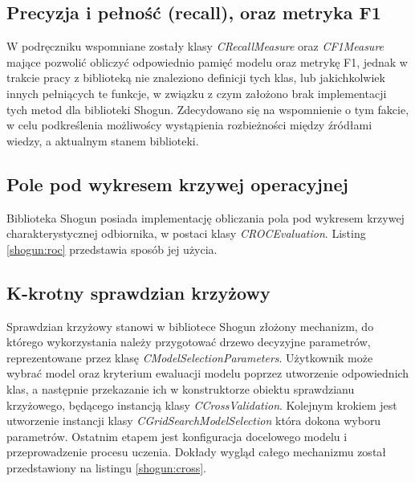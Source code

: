 
\subsection{Precyzja i pełność (recall), oraz metryka F1}

W podręczniku \cite{handsOnMachineLearning} wspomniane zostały klasy \textit{CRecallMeasure} oraz \textit{CF1Measure} mające pozwolić obliczyć odpowiednio pamięć modelu oraz metrykę F1, jednak w trakcie pracy z biblioteką nie znaleziono definicji tych klas, lub jakichkolwiek innych pełniących te funkcje, w związku z czym założono brak implementacji tych metod dla biblioteki Shogun. Zdecydowano się na wspomnienie o tym fakcie, w celu podkreślenia możliwoścy wystąpienia rozbieżności między źródłami wiedzy, a aktualnym stanem biblioteki.

\subsection{Pole pod wykresem krzywej operacyjnej}

Biblioteka Shogun posiada implementację obliczania pola pod wykresem krzywej charakterystycznej odbiornika, w postaci klasy \textit{CROCEvaluation}. Listing \ref{shogun:roc} przedstawia sposób jej użycia.


\subsection{K-krotny sprawdzian krzyżowy}

Sprawdzian krzyżowy stanowi w bibliotece Shogun złożony mechanizm, do którego wykorzystania należy przygotować drzewo decyzyjne parametrów, reprezentowane przez klasę \textit{CModelSelectionParameters}. Użytkownik może wybrać model oraz kryterium ewaluacji modelu poprzez utworzenie odpowiednich klas, a następnie przekazanie ich w konstruktorze obiektu sprawdzianu krzyżowego, będącego instancją klasy \textit{CCrossValidation}. Kolejnym krokiem jest utworzenie instancji klasy \textit{CGridSearchModelSelection} która dokona wyboru parametrów. Ostatnim etapem jest konfiguracja docelowego modelu i przeprowadzenie procesu uczenia. Dokłady wygląd całego mechanizmu został przedstawiony na listingu \ref{shogun:cross}.

